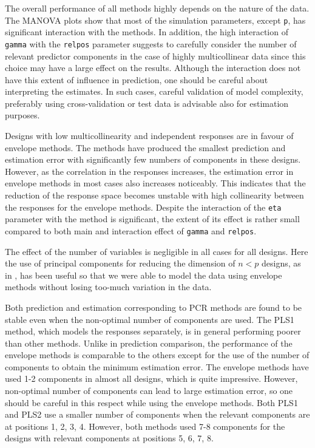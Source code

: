 \documentclass[12pt,3p,authoryear]{elsarticle}
\begin{document}
The overall performance of all methods highly depends on the nature of
the data. The MANOVA plots show that most of the simulation parameters,
except \texttt{p}, has significant interaction with the methods. In
addition, the high interaction of \texttt{gamma} with the
\texttt{relpos} parameter suggests to carefully consider the number of
relevant predictor components in the case of highly multicollinear data
since this choice may have a large effect on the results. Although the
interaction does not have this extent of influence in prediction, one
should be careful about interpreting the estimates. In such cases,
careful validation of model complexity, preferably using
cross-validation or test data is advisable also for estimation purposes.

Designs with low multicollinearity and independent responses are in
favour of envelope methods. The methods have produced the smallest
prediction and estimation error with significantly few numbers of
components in these designs. However, as the correlation in the
responses increases, the estimation error in envelope methods in most
cases also increases noticeably. This indicates that the reduction of
the response space becomes unstable with high collinearity between the
responses for the envelope methods. Despite the interaction of the
\texttt{eta} parameter with the method is significant, the extent of its
effect is rather small compared to both main and interaction effect of
\texttt{gamma} and \texttt{relpos}.

The effect of the number of variables is negligible in all cases for all
designs. Here the use of principal components for reducing the dimension
of \(n<p\) designs, as in \citet{rimal2019pred}, has been useful so that
we were able to model the data using envelope methods without losing
too-much variation in the data.

Both prediction and estimation corresponding to PCR methods are found to
be stable even when the non-optimal number of components are used. The
PLS1 method, which models the responses separately, is in general
performing poorer than other methods. Unlike in prediction comparison,
the performance of the envelope methods is comparable to the others
except for the use of the number of components to obtain the minimum
estimation error. The envelope methods have used 1-2 components in
almost all designs, which is quite impressive. However, non-optimal
number of components can lead to large estimation error, so one should
be careful in this respect while using the envelope methods. Both PLS1
and PLS2 use a smaller number of components when the relevant components
are at positions 1, 2, 3, 4. However, both methods used 7-8 components
for the designs with relevant components at positions 5, 6, 7, 8.
\end{document}
